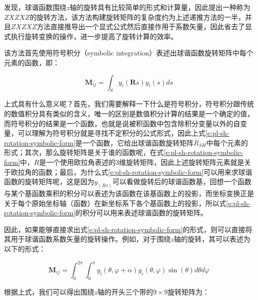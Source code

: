 \cite{a:FastArbitraryBRDFShadingforLowFrequencyLightingUsingSphericalHarmonics}发现，球谐函数围绕$z$轴的旋转具有比较简单的形式和计算量，因此提出一种称为$ZXZXZ$的旋转方法，该方法构建旋转矩阵的复杂度约为上述递推方法的一半，并且$ZXZXZ$方法直接推导出一个显式公式然后直接作用于系数矢量，因此省去了显式执行旋转变换的操作，进一步提高了旋转计算的效率。

该方法首先使用符号积分（symbolic integration）表述出球谐函数旋转矩阵中每个元素的函数，即：

\begin{equation}\label{e:pl-sh-rotation-symbolic-form}
	\mathbf{M}_{ij}=\int_S y_i(\mathbf{R}s)y_i(s)ds
\end{equation}

上式具有什么意义呢？首先，我们需要解释一下什么是符号积分，符号积分跟传统的数值积分具有类似的含义，唯一的区别是数值积分计算的结果是一个确定的值，而符号积分的结果是一个函数，也就是说被积函数中包含除积分变量以外的自变量，可以理解为符号积分就是寻找不定积分的公式形式，因此上式\ref{e:pl-sh-rotation-symbolic-form}是一个函数，它给出球谐函数旋转矩阵$R_{SH}$中每个元素的形式；其次，那么旋转矩阵是关于谁的函数呢，在式\ref{e:pl-sh-rotation-symbolic-form}中，$R$是一个使用欧拉角表述的3维旋转矩阵，因此上述旋转矩阵元素就是关于欧拉角的函数；最后，为什么式\ref{e:pl-sh-rotation-symbolic-form}可以用来求球谐函数的旋转矩阵呢，这是因为$y_(Rs)$可以看做旋转后的球谐函数基，回想一个函数与某个基函数乘积的积分可以表述为该函数在该基函数上的投影，而坐标变换正是关于每个原始坐标轴（函数）在新坐标系下各个基函数上的投影，所以式\ref{e:pl-sh-rotation-symbolic-form}的积分可以用来表述球谐函数的旋转矩阵。

因此，如果能够直接求出式\ref{e:pl-sh-rotation-symbolic-form}的形式，则可以直接将其用于球谐函数系数矢量的旋转操作。例如，对于围绕$z$轴的旋转，其可以表述为以下的形式：

\begin{equation}
	\mathbf{M}_{ij}=\int^{2\pi}_0\int^{\pi}_0y_i(\theta,\varphi+\alpha)y_i(\theta,\varphi)\sin(\theta)d\theta d\varphi
\end{equation}

根据上式，我们可以得出围绕$z$轴的开头三个带的$9\times 9$旋转矩阵为：

